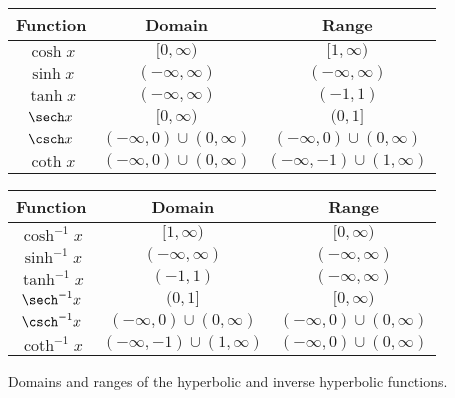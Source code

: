 {}



\noindent\begin{minipage}{\textwidth}
\small
\begin{tabular}{ccc}
Function & Domain & Range\\ \hline
$\cosh x$ & $[0,\infty)$ & $[1,\infty)$\\
$\sinh x$ & $(-\infty,\infty)$ & $(-\infty,\infty)$\\
$\tanh x$ & $(-\infty,\infty)$ & $(-1,1)$\\
$\sech x$ & $[0,\infty)$ & $(0,1]$ \\
$\csch x$ & $(-\infty,0) \cup (0,\infty)$ & $(-\infty,0) \cup (0,\infty)$\\
$\coth x$ & $(-\infty,0) \cup (0,\infty)$ & $(-\infty,-1) \cup (1,\infty)$
\end{tabular}
\hskip 40pt
\begin{tabular}{ccc}
Function & Domain & Range\\ \hline
\rule{0pt}{10pt}$\cosh^{-1} x$ & $[1,\infty)$ & $[0,\infty)$ \\
$\sinh^{-1} x$ & $(-\infty,\infty)$ & $(-\infty,\infty)$\\
$\tanh^{-1} x$ & $(-1,1)$ & $(-\infty,\infty)$\\
$\sech^{-1} x$ & $(0,1]$ & $[0,\infty)$ \\
$\csch^{-1} x$ & $(-\infty,0) \cup (0,\infty)$ & $(-\infty,0) \cup (0,\infty)$\\
$\coth^{-1} x$ & $(-\infty,-1) \cup (1,\infty)$ & $(-\infty,0) \cup (0,\infty)$
\end{tabular}
\captionsetup{type=figure}%
\caption{Domains and ranges of the hyperbolic and inverse hyperbolic functions.}\label{fig:hfinverse2}
\end{minipage}
\enlargethispage{3\baselineskip}


